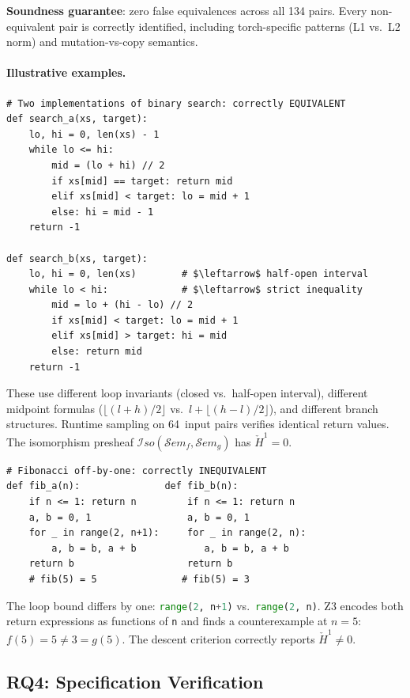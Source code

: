 \documentclass[acmsmall,screen]{acmart}
\theoremstyle{remark}
\newcommand{\Sem}{\mathcal{S}\mathit{em}}
\newcommand{\Hc}[1]{\check{H}^{#1}}
\newcommand{\Iso}{\mathcal{I}\mathit{so}}
\newcommand{\py}[1]{\lstinline[language=Python]{#1}}
\begin{document}
\noindent \textbf{Soundness guarantee}: zero false equivalences across
all 134 pairs.  Every non-equivalent pair is correctly identified,
including torch-specific patterns (L1 vs.\ L2 norm) and
mutation-vs-copy semantics.

\paragraph{Illustrative examples.}

\begin{lstlisting}
# Two implementations of binary search: correctly EQUIVALENT
def search_a(xs, target):
    lo, hi = 0, len(xs) - 1
    while lo <= hi:
        mid = (lo + hi) // 2
        if xs[mid] == target: return mid
        elif xs[mid] < target: lo = mid + 1
        else: hi = mid - 1
    return -1

def search_b(xs, target):
    lo, hi = 0, len(xs)        # $\leftarrow$ half-open interval
    while lo < hi:             # $\leftarrow$ strict inequality
        mid = lo + (hi - lo) // 2
        if xs[mid] < target: lo = mid + 1
        elif xs[mid] > target: hi = mid
        else: return mid
    return -1
\end{lstlisting}

\noindent These use different loop invariants (closed vs.\ half-open
interval), different midpoint formulas ($\lfloor(l+h)/2\rfloor$ vs.\
$l + \lfloor(h-l)/2\rfloor$), and different branch structures.
Runtime sampling on 64~input pairs verifies identical return values.
The isomorphism presheaf $\Iso(\Sem_f, \Sem_g)$ has $\Hc{1} = 0$.

\begin{lstlisting}
# Fibonacci off-by-one: correctly INEQUIVALENT
def fib_a(n):               def fib_b(n):
    if n <= 1: return n         if n <= 1: return n
    a, b = 0, 1                 a, b = 0, 1
    for _ in range(2, n+1):     for _ in range(2, n):
        a, b = b, a + b            a, b = b, a + b
    return b                    return b
    # fib(5) = 5               # fib(5) = 3
\end{lstlisting}

\noindent The loop bound differs by one: \py{range(2, n+1)} vs.\
\py{range(2, n)}.  Z3 encodes both return expressions as functions of
\py{n} and finds a counterexample at $n = 5$: $f(5) = 5 \neq 3 = g(5)$.
The descent criterion correctly reports $\Hc{1} \neq 0$.

\subsection{RQ4: Specification Verification}\label{sec:rq4}
\end{document}
